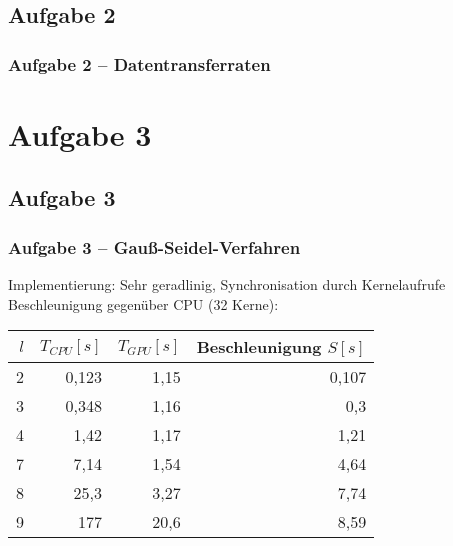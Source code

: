 \documentclass[german,notes,18pt]{beamer}
\begin{document}
	\subsection{Aufgabe 2}
	\begin{frame}
		\frametitle{Aufgabe 2 -- Datentransferraten}
		
	\end{frame}

	\section{Aufgabe 3}
	\subsection{Aufgabe 3}
	\begin{frame}
		\frametitle{Aufgabe 3 -- Gauß-Seidel-Verfahren}
		Implementierung: Sehr geradlinig, Synchronisation durch Kernelaufrufe \\
		\vspace{2em}
		Beschleunigung gegenüber CPU (32 Kerne):
		\begin{center}
			\begin{tabular}{r|r|r|r}
			$l$ & $T_{CPU}[s]$ & $T_{GPU}[s]$ & Beschleunigung $S[s]$ \\
			\hline
			2 & 0,123 & 1,15 & \color{lightred}0,107 \\
			3 & 0,348 & 1,16 & \color{lightred}0,3  \\
			4 & 1,42 & 1,17 & 1,21 \\
			\hline
			7 & 7,14 & 1,54 & 4,64 \\
			8 & 25,3 & 3,27 & 7,74 \\
			9 & 177 & 20,6 & 8,59 \\
		\end{tabular}
		\end{center}
	\end{frame}
\end{document}
